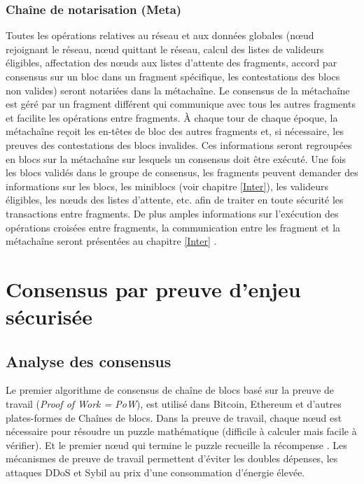 \documentclass[journal]{IEEEtran}
\begin{document}
\subsubsection{Chaîne de notarisation (Meta)}

Toutes les opérations relatives au réseau et aux données globales (nœud rejoignant le réseau, nœud quittant le réseau, calcul des listes de valideurs éligibles, affectation des nœuds aux listes d'attente des fragments, accord par consensus sur un bloc dans un fragment spécifique, les contestations des blocs non valides) seront notariées dans la métachaîne. Le consensus de la métachaîne est géré par un fragment différent qui communique avec tous les autres fragments et facilite les opérations entre fragments. À chaque tour de chaque époque, la métachaîne reçoit les en-têtes de bloc des autres fragments et, si nécessaire, les preuves des contestations des blocs invalides. Ces informations seront regroupées en blocs sur la métachaîne sur lesquels un consensus doit être exécuté. Une fois les blocs validés dans le groupe de consensus, les fragments peuvent demander des informations sur les blocs, les miniblocs (voir chapitre \ref{Inter}), les valideurs éligibles, les nœuds des listes d'attente, etc. afin de traiter en toute sécurité les transactions entre fragments. De plus amples informations sur l'exécution des opérations croisées entre fragments, la communication entre les fragment et la métachaîne seront présentées au chapitre \ref{Inter} .

\section{Consensus par preuve d'enjeu sécurisée}
\label{Conse}

\subsection{Analyse des consensus}
Le premier algorithme de consensus de chaîne  de blocs basé sur la preuve de travail (\textit{Proof of Work = PoW}), est utilisé dans Bitcoin, Ethereum et d'autres plates-formes de Chaînes de blocs. Dans la preuve de travail, chaque nœud est nécessaire pour résoudre un puzzle mathématique (difficile à calculer mais facile à vérifier). Et le premier nœud qui termine le puzzle recueille la récompense \cite{18}. Les mécanismes de preuve de travail permettent d'éviter les doubles dépenses, les attaques DDoS et Sybil au prix d'une consommation d'énergie élevée.
\end{document}
